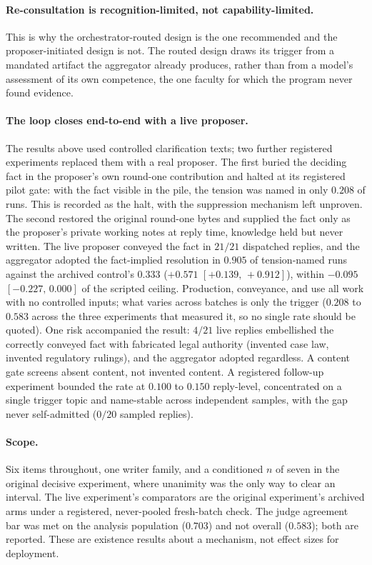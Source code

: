 \documentclass[11pt]{article}
\newcommand{\ci}[2]{\ensuremath{[#1,\,#2]}}
\begin{document}
\paragraph{Re-consultation is recognition-limited, not
capability-limited.} This is why the orchestrator-routed design is the
one recommended and the proposer-initiated design is not. The routed
design draws its trigger from a mandated artifact the aggregator
already produces, rather than from a model's assessment of its own
competence, the one faculty for which the program never found evidence.

\paragraph{The loop closes end-to-end with a live proposer.} The
results above used controlled clarification texts; two further
registered experiments replaced them with a real proposer. The first
buried the deciding fact in the proposer's own round-one contribution
and halted at its registered pilot gate: with the fact visible in the
pile, the tension was named in only $0.208$ of runs. This is recorded
as the halt, with the suppression mechanism left unproven. The second
restored the original round-one bytes and supplied the fact only as the
proposer's private working notes at reply time, knowledge held but
never written. The live proposer conveyed the fact in $21/21$
dispatched replies, and the aggregator adopted the fact-implied
resolution in $0.905$ of tension-named runs against the archived
control's $0.333$ ($+0.571$ \ci{+0.139}{+0.912}), within $-0.095$
\ci{-0.227}{0.000} of the scripted ceiling. Production, conveyance, and
use all work with no controlled inputs; what varies across batches is
only the trigger ($0.208$ to $0.583$ across the three experiments that
measured it, so no single rate should be quoted). One risk accompanied
the result: $4/21$ live replies embellished the correctly conveyed fact
with fabricated legal authority (invented case law, invented regulatory
rulings), and the aggregator adopted regardless. A content gate screens
absent content, not invented content. A registered follow-up
experiment bounded the rate at $0.100$ to $0.150$ reply-level,
concentrated on a single trigger topic and name-stable across
independent samples, with the gap never self-admitted ($0/20$ sampled
replies).

\paragraph{Scope.} Six items throughout, one writer family, and a
conditioned $n$ of seven in the original decisive experiment, where
unanimity was the only way to clear an interval. The live experiment's
comparators are the original experiment's archived arms under a
registered, never-pooled fresh-batch check. The judge agreement bar
was met on the analysis population ($0.703$) and not overall ($0.583$);
both are reported. These are existence results about a mechanism, not
effect sizes for deployment.
\end{document}
